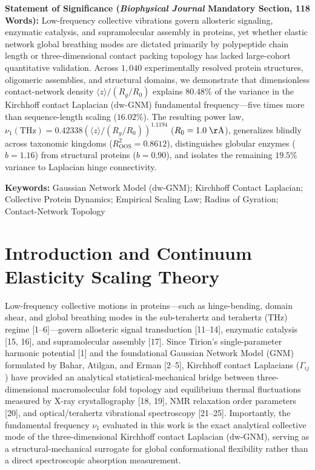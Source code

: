 \documentclass[11pt,onecolumn,letterpaper]{article}
\begin{document}
\noindent\textbf{Statement of Significance (\textit{Biophysical Journal} Mandatory Section, 118 Words):} Low-frequency collective vibrations govern allosteric signaling, enzymatic catalysis, and supramolecular assembly in proteins, yet whether elastic network global breathing modes are dictated primarily by polypeptide chain length or three-dimensional contact packing topology has lacked large-cohort quantitative validation. Across $1,040$ experimentally resolved protein structures, oligomeric assemblies, and structural domains, we demonstrate that dimensionless contact-network density $\langle z \rangle / (R_g / R_0)$ explains $80.48\%$ of the variance in the Kirchhoff contact Laplacian ($\mathrm{dw\text{-}GNM}$) fundamental frequency---five times more than sequence-length scaling ($16.02\%$). The resulting power law, $\nu_1(\mathrm{THz}) = 0.42338 (\langle z \rangle / (R_g / R_0))^{1.1194}$ ($R_0 = 1.0\;\mathrm{\AA}$), generalizes blindly across taxonomic kingdoms ($R^2_{\mathrm{OOS}} = 0.8612$), distinguishes globular enzymes ($b = 1.16$) from structural proteins ($b = 0.90$), and isolates the remaining $19.5\%$ variance to Laplacian hinge connectivity.

\noindent\textbf{Keywords:} Gaussian Network Model ($\mathrm{dw\text{-}GNM}$); Kirchhoff Contact Laplacian; Collective Protein Dynamics; Empirical Scaling Law; Radius of Gyration; Contact-Network Topology

\section{Introduction and Continuum Elasticity Scaling Theory}
Low-frequency collective motions in proteins---such as hinge-bending, domain shear, and global breathing modes in the sub-terahertz and terahertz ($\mathrm{THz}$) regime [1--6]---govern allosteric signal transduction [11--14], enzymatic catalysis [15, 16], and supramolecular assembly [17]. Since Tirion's single-parameter harmonic potential [1] and the foundational Gaussian Network Model (GNM) formulated by Bahar, Atilgan, and Erman [2--5], Kirchhoff contact Laplacians ($\Gamma_{ij}$) have provided an analytical statistical-mechanical bridge between three-dimensional macromolecular fold topology and equilibrium thermal fluctuations measured by X-ray crystallography [18, 19], NMR relaxation order parameters [20], and optical/terahertz vibrational spectroscopy [21--25]. Importantly, the fundamental frequency $\nu_1$ evaluated in this work is the exact analytical collective mode of the three-dimensional Kirchhoff contact Laplacian ($\mathrm{dw\text{-}GNM}$), serving as a structural-mechanical surrogate for global conformational flexibility rather than a direct spectroscopic absorption measurement.
\end{document}

